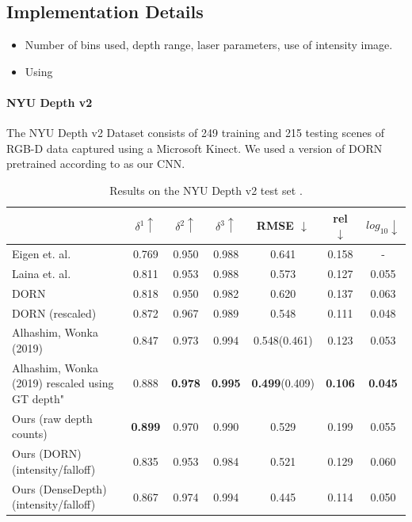 \subsection{Implementation Details}
\begin{itemize}
  \item Number of bins used, depth range, laser parameters, use of intensity
    image.
  \item Using
\end{itemize}
\paragraph{NYU Depth v2}
The NYU Depth v2 Dataset consists of 249 training and 215 testing scenes of
RGB-D data captured using a Microsoft Kinect. We used a version of DORN
pretrained according to \cite{Fu. et al} as our CNN.
\newpage
\begin{table}
\begin{center}
\begin{tabular}{lccc|ccc}
  \toprule
    & $\delta^1 \uparrow$ & $\delta^2\uparrow$ & $\delta^3 \uparrow$ & RMSE $\downarrow$ & rel $\downarrow$ & $log_{10} \downarrow$ \\
  \midrule
Eigen et. al. & 0.769 & 0.950 & 0.988 & 0.641 & 0.158 & - \\ 
Laina et. al.&0.811&0.953&0.988&0.573&0.127&0.055 \\
DORN&0.818&0.950&0.982&0.620&0.137&0.063 \\
  DORN (rescaled) & 0.872 & 0.967 & 0.989 & 0.548 & 0.111 & 0.048 \\
Alhashim, Wonka (2019)&0.847&0.973&0.994&0.548(0.461)&0.123&0.053 \\
Alhashim, Wonka (2019) rescaled using GT depth"&0.888&\textbf{0.978}&\textbf{0.995}&\textbf{0.499}(0.409)&\textbf{0.106}&\textbf{0.045} \\
  \midrule
  Ours (raw depth counts) & \textbf{0.899} & 0.970 & 0.990 & 0.529 & 0.199 & 0.055 \\
  Ours (DORN) (intensity/falloff) & 0.835 & 0.953 & 0.984 & 0.521 & 0.129 & 0.060 \\
  Ours (DenseDepth) (intensity/falloff) & 0.867 & 0.974 & 0.994 & 0.445 & 0.114 & 0.050 \\
  \bottomrule
\end{tabular} 
\end{center}
\caption{Results on the NYU Depth v2 test set \cite{nyudepth}.}
\end{table}

